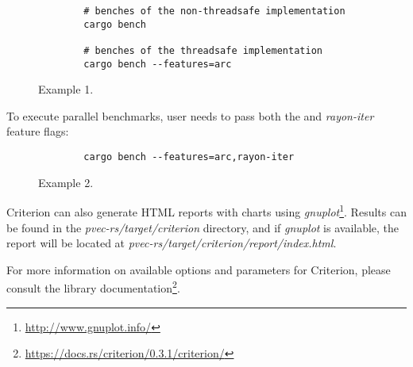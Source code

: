 \begin{figure}[!htbp]
    \centering

    \begin{verbatim}
        # benches of the non-threadsafe implementation
        cargo bench

        # benches of the threadsafe implementation
        cargo bench --features=arc
    \end{verbatim}

    \caption{Example 1.}
    \label{fig:sequential-benches}
\end{figure}

To execute parallel benchmarks, user needs to pass both the \arc{} and \emph{rayon-iter} feature flags:

\begin{figure}[!htbp]
    \centering

    \begin{verbatim}
        cargo bench --features=arc,rayon-iter
    \end{verbatim}

    \caption{Example 2.}
    \label{fig:parallel-benches}
\end{figure}

Criterion can also generate HTML reports with charts using \emph{gnuplot}\footnote{\url{http://www.gnuplot.info/}}. Results can be found in the \emph{pvec-rs/target/criterion} directory, and if \emph{gnuplot} is available, the report will be located at \emph{pvec-rs/target/criterion/report/index.html}.

For more information on available options and parameters for Criterion, please consult the library documentation\footnote{\url{https://docs.rs/criterion/0.3.1/criterion/}}.
